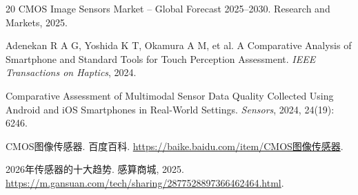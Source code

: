 \documentclass[12pt, a4paper]{ctexart}
\begin{document}
\begin{thebibliography}{20}
    CMOS Image Sensors Market -- Global Forecast 2025--2030.
    Research and Markets, 2025.

    Adenekan R A G, Yoshida K T, Okamura A M, et al.
    A Comparative Analysis of Smartphone and Standard Tools for Touch Perception Assessment.
    \textit{IEEE Transactions on Haptics}, 2024.

    Comparative Assessment of Multimodal Sensor Data Quality Collected Using Android and iOS Smartphones in Real-World Settings.
    \textit{Sensors}, 2024, 24(19): 6246.

    CMOS图像传感器.
    百度百科.
    \url{https://baike.baidu.com/item/CMOS图像传感器}.

    2026年传感器的十大趋势.
    感算商城, 2025.
    \url{https://m.gansuan.com/tech/sharing/2877528897366462464.html}.

\end{thebibliography}
\end{document}
